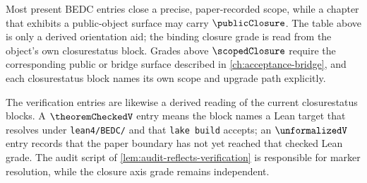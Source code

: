 \begin{remark}
\label{rem:why-all-scoped}
Most present BEDC entries close a precise, paper-recorded scope, while a chapter that exhibits a public-object surface may carry $\publicClosure$. The table above is only a derived orientation aid; the binding closure grade is read from the object's own closurestatus block. Grades above $\scopedClosure$ require the corresponding public or bridge surface described in \autoref{ch:acceptance-bridge}, and each closurestatus block names its own scope and upgrade path explicitly.
\end{remark}

\begin{remark}
\label{rem:verification-axis-uniform}
The verification entries are likewise a derived reading of the current closurestatus blocks. A $\theoremCheckedV$ entry means the block names a Lean target that resolves under \texttt{lean4/BEDC/} and that \texttt{lake build} accepts; an $\unformalizedV$ entry records that the paper boundary has not yet reached that checked Lean grade. The audit script of \autoref{lem:audit-reflects-verification} is responsible for marker resolution, while the closure axis grade remains independent.
\end{remark}
